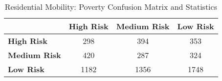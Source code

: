 \begin{table}[!htbp]
    \small
    \centering
    \caption{Residential Mobility: Poverty Confusion Matrix and Statistics}
    \label{tab:trans_pov_confusion}
    \begin{tabular}{lccc}
        \toprule
        & \textbf{High Risk} & \textbf{Medium Risk} & \textbf{Low Risk} \\
        \midrule
        \textbf{High Risk} & 298 & 394 & 353 \\
        \textbf{Medium Risk} & 420 & 287 & 324 \\
        \textbf{Low Risk} & 1182 & 1356 & 1748 \\
        \bottomrule

    \end{tabular}
\end{table}